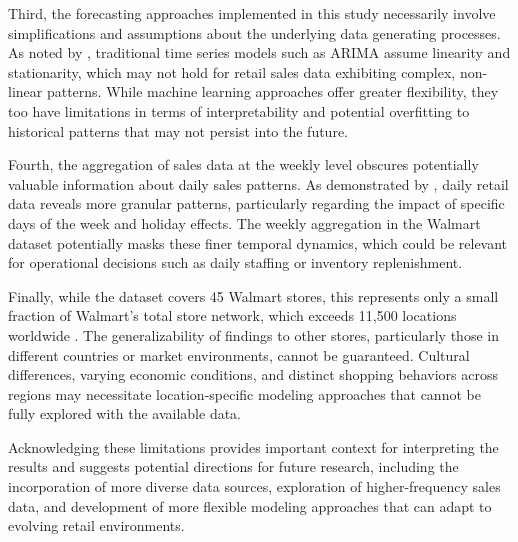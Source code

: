 Third, the forecasting approaches implemented in this study necessarily involve simplifications and assumptions about the underlying data generating processes. As noted by \cite{Pao:2017}, traditional time series models such as ARIMA assume linearity and stationarity, which may not hold for retail sales data exhibiting complex, non-linear patterns. While machine learning approaches offer greater flexibility, they too have limitations in terms of interpretability and potential overfitting to historical patterns that may not persist into the future.

Fourth, the aggregation of sales data at the weekly level obscures potentially valuable information about daily sales patterns. As demonstrated by \cite{McElroy:2018}, daily retail data reveals more granular patterns, particularly regarding the impact of specific days of the week and holiday effects. The weekly aggregation in the Walmart dataset potentially masks these finer temporal dynamics, which could be relevant for operational decisions such as daily staffing or inventory replenishment.

Finally, while the dataset covers 45 Walmart stores, this represents only a small fraction of Walmart's total store network, which exceeds 11,500 locations worldwide \cite{Zhang:2021}. The generalizability of findings to other stores, particularly those in different countries or market environments, cannot be guaranteed. Cultural differences, varying economic conditions, and distinct shopping behaviors across regions may necessitate location-specific modeling approaches that cannot be fully explored with the available data.

Acknowledging these limitations provides important context for interpreting the results and suggests potential directions for future research, including the incorporation of more diverse data sources, exploration of higher-frequency sales data, and development of more flexible modeling approaches that can adapt to evolving retail environments.